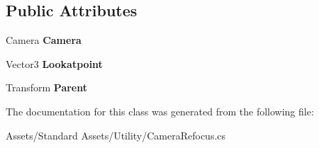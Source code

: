 \subsection*{Public Attributes}
\begin{DoxyCompactItemize}
\item 
Camera {\bfseries Camera}\hypertarget{class_unity_standard_assets_1_1_utility_1_1_camera_refocus_af2e66852407defac8d42928618ac667f}{}\label{class_unity_standard_assets_1_1_utility_1_1_camera_refocus_af2e66852407defac8d42928618ac667f}

\item 
Vector3 {\bfseries Lookatpoint}\hypertarget{class_unity_standard_assets_1_1_utility_1_1_camera_refocus_a1befa53fb7728dcc2fa0e4862dd60543}{}\label{class_unity_standard_assets_1_1_utility_1_1_camera_refocus_a1befa53fb7728dcc2fa0e4862dd60543}

\item 
Transform {\bfseries Parent}\hypertarget{class_unity_standard_assets_1_1_utility_1_1_camera_refocus_ab5d9f1645e7f5f07c617be54fe20bd14}{}\label{class_unity_standard_assets_1_1_utility_1_1_camera_refocus_ab5d9f1645e7f5f07c617be54fe20bd14}

\end{DoxyCompactItemize}


The documentation for this class was generated from the following file\+:\begin{DoxyCompactItemize}
\item 
Assets/\+Standard Assets/\+Utility/Camera\+Refocus.\+cs\end{DoxyCompactItemize}
